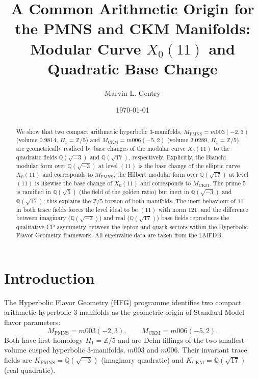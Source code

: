 \documentclass[11pt,a4paper]{article}
\theoremstyle{definition}
\newcommand{\QQ}{\mathbb{Q}}
\newcommand{\ZZ}{\mathbb{Z}}
\newcommand{\MPMNS}{M_{\mathrm{PMNS}}}
\newcommand{\MCKM}{M_{\mathrm{CKM}}}
\newcommand{\Kpmns}{K_{\mathrm{PMNS}}}
\newcommand{\Kckm}{K_{\mathrm{CKM}}}
\begin{document}
\title{A Common Arithmetic Origin for the PMNS and CKM Manifolds:\\
Modular Curve \(X_0(11)\) and Quadratic Base Change}

\author[1]{Marvin L. Gentry}
\date{\today}

\begin{abstract}
We show that two compact arithmetic hyperbolic 3-manifolds,
$\MPMNS = m003(-2,3)$ (volume $0.9814$, $H_1=\ZZ/5$) and
$\MCKM = m006(-5,2)$ (volume $2.0289$, $H_1=\ZZ/5$), are
geometrically realised by base changes of the modular curve
$X_0(11)$ to the quadratic fields $\QQ(\sqrt{-3})$ and $\QQ(\sqrt{17})$,
respectively.
Explicitly, the Bianchi modular form over $\QQ(\sqrt{-3})$ at level
$(11)$ is the base change of the elliptic curve $X_0(11)$ and corresponds
to $\MPMNS$; the Hilbert modular form over $\QQ(\sqrt{17})$ at level
$(11)$ is likewise the base change of $X_0(11)$ and corresponds to
$\MCKM$.
The prime $5$ is ramified in $\QQ(\sqrt{5})$ (the field of the golden
ratio) but inert in $\QQ(\sqrt{-3})$ and $\QQ(\sqrt{17})$; this explains
the $\ZZ/5$ torsion of both manifolds.
The inert behaviour of $11$ in both trace fields forces the level ideal
to be $(11)$ with norm $121$, and the difference between imaginary
($\QQ(\sqrt{-3})$) and real ($\QQ(\sqrt{17})$) base fields reproduces
the qualitative CP asymmetry between the lepton and quark sectors
within the Hyperbolic Flavor Geometry framework.
All eigenvalue data are taken from the LMFDB.
\end{abstract}

\section{Introduction}
\label{sec:intro}

The Hyperbolic Flavor Geometry (HFG) programme
\cite{Gentry:Unified} identifies two compact arithmetic hyperbolic
3-manifolds as the geometric origin of Standard Model flavor
parameters:
\[
\MPMNS = m003(-2,3),\qquad
\MCKM = m006(-5,2).
\]
Both have first homology $H_1 = \ZZ/5$ and are Dehn fillings of the
two smallest-volume cusped hyperbolic 3-manifolds, $m003$ and $m006$.
Their invariant trace fields are $\Kpmns = \QQ(\sqrt{-3})$ (imaginary
quadratic) and $\Kckm = \QQ(\sqrt{17})$ (real quadratic).
\end{document}
